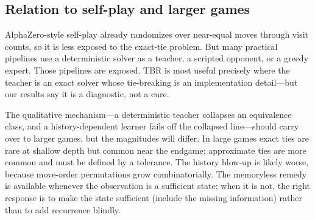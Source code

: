 \documentclass[conference]{IEEEtran}
\begin{document}
\subsection{Relation to self-play and larger games}
AlphaZero-style self-play already randomizes over near-equal moves through visit counts, so it is less exposed to the exact-tie problem. But many practical pipelines use a deterministic solver as a teacher, a scripted opponent, or a greedy expert. Those pipelines are exposed. TBR is most useful precisely where the teacher is an exact solver whose tie-breaking is an implementation detail---but our results say it is a diagnostic, not a cure.

The qualitative mechanism---a deterministic teacher collapses an equivalence class, and a history-dependent learner fails off the collapsed line---should carry over to larger games, but the magnitudes will differ. In large games exact ties are rare at shallow depth but common near the endgame; approximate ties are more common and must be defined by a tolerance. The history blow-up is likely worse, because move-order permutations grow combinatorially. The memoryless remedy is available whenever the observation is a sufficient state; when it is not, the right response is to make the state sufficient (include the missing information) rather than to add recurrence blindly.
\end{document}
